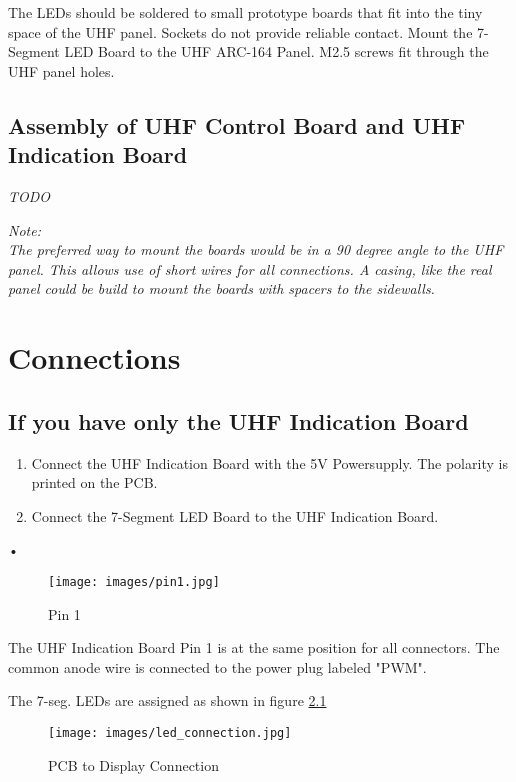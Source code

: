 \documentclass[12pt, a4paper]{report}
\begin{document}
The LEDs should be soldered to small prototype boards that fit into the tiny space of the UHF panel. Sockets do not provide reliable contact.
Mount the 7-Segment LED Board to the UHF ARC-164 Panel. M2.5 screws fit through the UHF panel holes.

\section{Assembly of UHF Control Board and UHF Indication Board}
\emph{TODO}

\emph{
Note: \\ The preferred  way to mount the boards would be in a 90 degree angle to the UHF panel. This allows use of short wires for all connections. A casing, like the real panel could be build to mount the boards with spacers to the sidewalls.
}

\chapter{Connections}
\section{If you have only the UHF Indication Board}
\begin{enumerate}
\item
Connect the UHF Indication Board with the 5V Powersupply. The polarity is printed on the PCB.
\item
Connect the 7-Segment LED Board to the UHF Indication Board.
\end{enumerate}•


\begin{figure}[h!tb]
\centering
\texttt{[image: images/pin1.jpg]}
\caption{Pin 1}
\end{figure}

The UHF Indication Board Pin 1 is at the same position for all connectors.
The common anode wire is connected to the power plug labeled "PWM".

The 7-seg. LEDs are assigned as shown in figure \ref{fig:ledConn}
\begin{figure}[h!]
\centering
\texttt{[image: images/led\_connection.jpg]}
\caption{PCB to Display Connection}
\label{fig:ledConn}
\end{figure}
\end{document}
